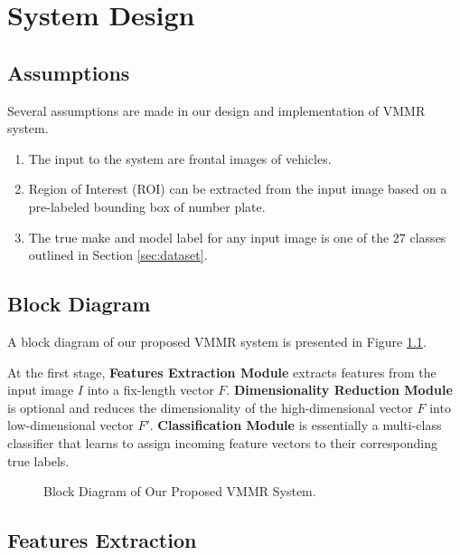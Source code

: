 \chapter{System Design}
\label{chap:design}

\section{Assumptions}

Several assumptions are made in our design and implementation of VMMR system.

\begin{enumerate}
\item
	The input to the system are frontal images of vehicles.
\item
	Region of Interest (ROI) can be extracted from the input image based on a pre-labeled bounding box of number plate.
\item
	The true make and model label for any input image is one of the $27$ classes outlined in Section \ref{sec:dataset}.
\end{enumerate}


\section{Block Diagram}

A block diagram of our proposed VMMR system is presented in Figure \ref{fig:system}.

At the first stage, \textbf{Features Extraction Module} extracts features from the input image $I$ into a fix-length vector $F$. 
\textbf{Dimensionality Reduction Module} is optional and reduces the dimensionality of the high-dimensional vector $F$ into low-dimensional vector $F'$.
\textbf{Classification Module} is essentially a multi-class classifier that learns to assign incoming feature vectors to their corresponding true labels.


\begin{figure}
\centering
\caption{Block Diagram of Our Proposed VMMR System.}
\label{fig:system}
\end{figure}

\section{Features Extraction}

